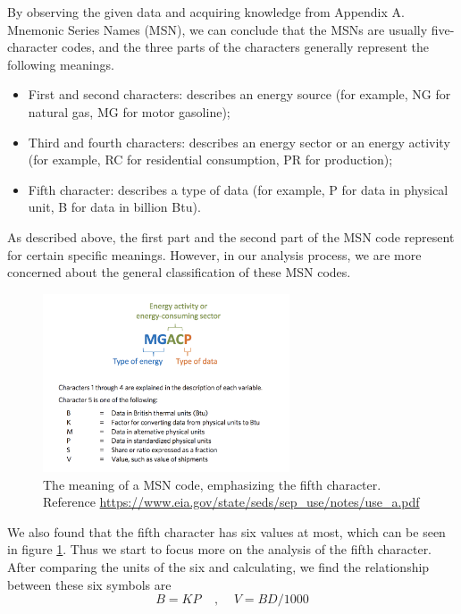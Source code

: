 \documentclass[a4paper,11pt]{article}
\begin{document}
\par By observing the given data and acquiring knowledge from Appendix A. Mnemonic Series Names (MSN)\cite{3}, we can conclude that the MSNs are usually five-character codes, and the three parts of the characters generally represent the following meanings.

\begin{itemize}
    \item First and second characters: describes an energy source (for example, NG for natural gas, MG for motor gasoline);
    \item Third and fourth characters: describes an energy sector or an energy activity (for example, RC for residential consumption, PR for production);
    \item Fifth character: describes a type of data (for example, P for data in physical unit, B for data in billion Btu).    \cite{3}
\end{itemize}

\par As described above, the first part and the second part of the MSN code represent for certain specific meanings. However, in our analysis process, we are more concerned about the general classification of these MSN codes. 

\begin{figure}[h]%
    \centering 
    \includegraphics[width=0.65\textwidth]{./Pic/msn_5.png}
    \caption{The meaning of a MSN code, emphasizing the fifth character. Reference \url{https://www.eia.gov/state/seds/sep_use/notes/use_a.pdf}}
    \label{fig:msn_5}  
\end{figure}
\par We also found that the fifth character has six values at most, which can be seen in figure \ref{fig:msn_5}. Thus we start to focus more on the analysis of the fifth character. After comparing the units of the six and calculating, we find the relationship between these six symbols are
\begin{equation}
    B=KP~~~~~,~~~~~V=BD / 1000
\end{equation}
\end{document}
